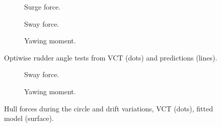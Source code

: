 \begin{figure}[h]
     \centering
     \begin{subfigure}[b]{0.32\textwidth}
         \centering
         
        \caption{Surge force.}
        \label{fig:drift_angle_X}
     \end{subfigure}
     \hfill
     \begin{subfigure}[b]{0.32\textwidth}
         \centering
         
        \caption{Sway force.}
        \label{fig:drift_angle_Y}
     \end{subfigure}
     \hfill
     \begin{subfigure}[b]{0.32\textwidth}
         \centering
         
        \caption{Yawing moment.}
        \label{fig:drift_angle_N}
     \end{subfigure}
    \caption{Optiwise rudder angle tests from VCT (dots) and predictions (lines).}
    \label{fig:drift_angle_wPCC}
\end{figure}
\begin{figure}[h]
     \centering
     \begin{subfigure}[b]{0.49\textwidth}
         \centering
         
        \caption{Sway force.}
        \label{fig:circle_drift_Y_H}
     \end{subfigure}
     \hfill
     \begin{subfigure}[b]{0.49\textwidth}
         \centering
         
        \caption{Yawing moment.}
        \label{fig:circle_drift_N_H}
     \end{subfigure}
    \caption{Hull forces during the circle and drift variations, VCT (dots), fitted model (surface).}
    \label{fig:circle_drift}
\end{figure}

